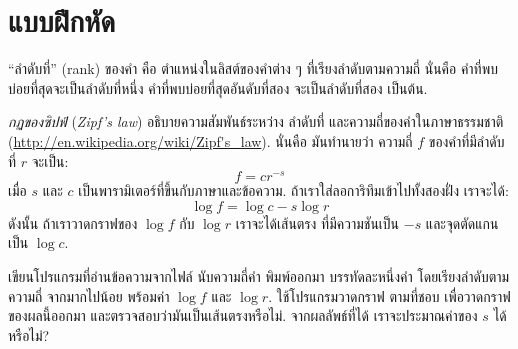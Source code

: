 \section{แบบฝึกหัด}

\begin{exercise}


``ลำดับที่'' (rank) ของคำ คือ ตำแหน่งในลิสต์ของคำต่าง ๆ ที่เรียงลำดับตามความถี่
นั่นคือ คำที่พบบ่อยที่สุดจะเป็นลำดับที่หนึ่ง
คำที่พบบ่อยที่สุดอันดับที่สอง จะเป็นลำดับที่สอง เป็นต้น.


\textit{กฏของซิปฟ์} (\textit{Zipf's law}) อธิบายความสัมพันธ์ระหว่าง ลำดับที่
และความถี่ของคำในภาษาธรรมชาติ
(\url{http://en.wikipedia.org/wiki/Zipf's_law}).  
นั่นคือ มันทำนายว่า ความถี่ $f$ ของคำที่มีลำดับที่ $r$ จะเป็น: 
%
\[ f = c r^{-s} \]
%
%
เมื่อ $s$ และ $c$ เป็นพารามิเตอร์ที่ขึ้นกับภาษาและข้อความ.
ถ้าเราใส่ลอการิทึมเข้าไปทั้งสองฝั่ง เราจะได้:
%
\[ \log f = \log c - s \log r \]
%
ดังนั้น ถ้าเราวาดกราฟของ $\log f$ กับ $\log r$ เราจะได้เส้นตรง 
ที่มีความชันเป็น $-s$ และจุดตัดแกนเป็น $\log c$.


เขียนโปรแกรมที่อ่านข้อความจากไฟล์
นับความถี่คำ
พิมพ์ออกมา บรรทัดละหนึ่งคำ โดยเรียงลำดับตามความถี่ จากมากไปน้อย
พร้อมค่า $\log f$ และ $\log r$.
ใช้โปรแกรมวาดกราฟ ตามที่ชอบ เพื่อวาดกราฟของผลนี้ออกมา
และตรวจสอบว่ามันเป็นเส้นตรงหรือไม่.
จากผลลัพธ์ที่ได้ เราจะประมาณค่าของ $s$ ได้หรือไม่?


\end{exercise}
